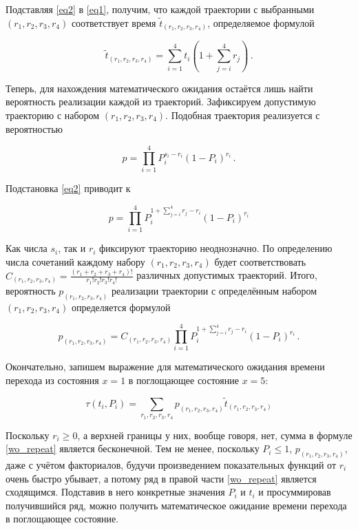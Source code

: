 \documentclass[12pt]{article}
\theoremstyle{definition}
\begin{document}
Подставляя \eqref{eq2} в \eqref{eq1}, получим, что каждой траектории с выбранными $(r_1,r_2,r_3,r_4)$ соответствует время $\tilde{t}_{(r_1,r_2,r_3,r_4)}$, определяемое формулой

\begin{equation}
\label{eq4}
    \tilde{t}_{(r_1,r_2,r_3,r_4)} = \sum_{i=1}^4 t_i(1+\sum_{j=i}^4r_j)\,.
\end{equation}

Теперь, для нахождения математического ожидания остаётся лишь найти вероятность реализации каждой из траекторий. Зафиксируем допустимую траекторию с набором $(r_1,r_2,r_3,r_4)$. Подобная траектория реализуется с вероятностью

\begin{equation}
    p = \prod_{i=1}^4 P_i^{s_i-r_i}(1-P_i)^{r_i}\,.
\end{equation}

Подстановка \eqref{eq2} приводит к

\begin{equation}
    p = \prod_{i=1}^4 P_i^{1+\sum_{j=i}^4r_j-r_i}(1-P_i)^{r_i}
\end{equation}

Как числа $s_i$, так и $r_i$ фиксируют траекторию неоднозначно. По определению числа сочетаний каждому набору $(r_1,r_2,r_3,r_4)$ будет соответствовать $C_{(r_1,r_2,r_3,r_4)}=\frac{(r_1+r_2+r_3+r_4)!}{r_1!r_2!r_3!r_4!}$ различных допустимых траекторий. Итого, вероятность $p_{(r_1,r_2,r_3,r_4)}$ реализации траектории с определённым набором $(r_1,r_2,r_3,r_4)$ определяется формулой

\begin{equation}
    p_{(r_1,r_2,r_3,r_4)} = C_{(r_1,r_2,r_3,r_4)}\prod_{i=1}^4 P_i^{1+\sum_{j=i}^4r_j-r_i}(1-P_i)^{r_i}\,.
\end{equation}

Окончательно, запишем выражение для математического ожидания времени перехода из состояния $x=1$ в поглощающее состояние $x=5$:

\begin{equation}
\label{wo_repeat}
    \tau(t_i,P_i) = \sum_{r_1,r_2,r_3,r_4} p_{(r_1,r_2,r_3,r_4)} \tilde{t}_{(r_1,r_2,r_3,r_4)}
\end{equation}

Поскольку $r_i\geq0$, а верхней границы у них, вообще говоря, нет, сумма в формуле \eqref{wo_repeat} является бесконечной. Тем не менее, поскольку $P_i\leq1$, $p_{(r_1,r_2,r_3,r_4)}$, даже с учётом факториалов, будучи произведением показательных функций от $r_i$ очень быстро убывает, а потому ряд в правой части \eqref{wo_repeat} является сходящимся. Подставив в него конкретные значения $P_i$ и $t_i$ и просуммировав получившийся ряд, можно получить математическое ожидание времени перехода в поглощающее состояние.
\end{document}

